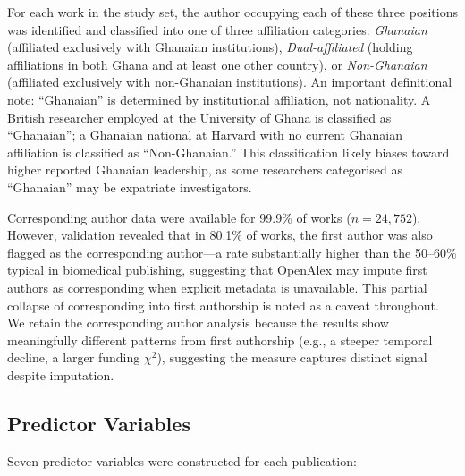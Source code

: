 \documentclass[12pt, a4paper]{article}
\begin{document}
For each work in the study set, the author occupying each of these three positions was identified and classified into one of three affiliation categories: \emph{Ghanaian} (affiliated exclusively with Ghanaian institutions), \emph{Dual-affiliated} (holding affiliations in both Ghana and at least one other country), or \emph{Non-Ghanaian} (affiliated exclusively with non-Ghanaian institutions). An important definitional note: ``Ghanaian'' is determined by institutional affiliation, not nationality. A British researcher employed at the University of Ghana is classified as ``Ghanaian''; a Ghanaian national at Harvard with no current Ghanaian affiliation is classified as ``Non-Ghanaian.'' This classification likely biases toward higher reported Ghanaian leadership, as some researchers categorised as ``Ghanaian'' may be expatriate investigators.

Corresponding author data were available for 99.9\% of works ($n = 24{,}752$). However, validation revealed that in 80.1\% of works, the first author was also flagged as the corresponding author---a rate substantially higher than the 50--60\% typical in biomedical publishing, suggesting that OpenAlex may impute first authors as corresponding when explicit metadata is unavailable. This partial collapse of corresponding into first authorship is noted as a caveat throughout. We retain the corresponding author analysis because the results show meaningfully different patterns from first authorship (e.g., a steeper temporal decline, a larger funding $\chi^2$), suggesting the measure captures distinct signal despite imputation.

\subsection{Predictor Variables}

Seven predictor variables were constructed for each publication:
\end{document}
